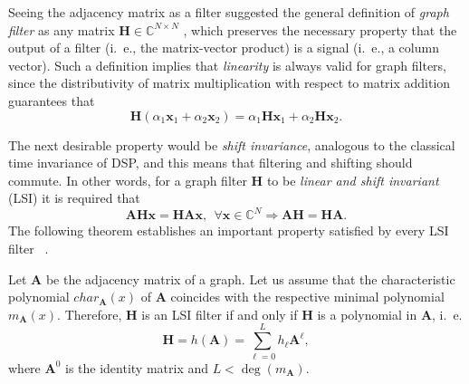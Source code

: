 Seeing the adjacency matrix as a filter suggested the general definition of \emph{graph filter} as any matrix $ \mathbf{H} \in \mathbb{C}^{N \times N} $ \cite{sandryhaila2013filters}, which preserves the necessary property that the output of a filter (i.~e., the matrix-vector product) is a signal (i.~e., a column vector). Such a definition implies that \emph{linearity} is always valid for graph filters, since the distributivity of matrix multiplication with respect to matrix addition guarantees that
\begin{equation}
\mathbf{H} (\alpha_1 \mathbf{x}_1 + \alpha_2 \mathbf{x}_2) =  \alpha_1 \mathbf{H} \mathbf{x}_1 + \alpha_2 \mathbf{H}  \mathbf{x}_2.
\end{equation}

The next desirable property would be \emph{shift invariance}, analogous to the classical time invariance of DSP, and this means that filtering and shifting should commute. In other words, for a graph filter $ \mathbf{H} $ to be \emph{linear and shift invariant} (LSI) it is required that
\begin{equation}
\label{eq:lsi_def}
\mathbf{A} \mathbf{H} \mathbf{x} = \mathbf{H} \mathbf{A} \mathbf{x}, \ \ \forall \mathbf{x} \in \mathbb{C}^N
\Rightarrow
\mathbf{A} \mathbf{H} = \mathbf{H} \mathbf{A}.
\end{equation}
The following theorem establishes an important property satisfied by every LSI filter~\cite{sandryhaila2013discrete} .
\vspace{0.2cm}
\begin{theorem}
\label{theo:01}
Let $ \mathbf{A} $ be the adjacency matrix of a graph. Let us assume that the characteristic polynomial $char_{\mathbf{A}}(x)$ of $\mathbf{A}$ coincides with the respective minimal polynomial $m_{\mathbf{A}}(x) $. Therefore, $ \mathbf{H} $ is an LSI filter if and only if $ \mathbf{H} $ is a polynomial in $ \mathbf{A} $, i.~e.
\begin{equation}\label{eq:filtro}
\mathbf{H} = h(\mathbf{A}) = \sum_{\ell=0}^{L} h_\ell \mathbf{A}^\ell,
\end{equation}
where $ \mathbf{A}^0 $ is the identity matrix and $ L < \deg(m_{\mathbf{A}}) $.
\end{theorem}

